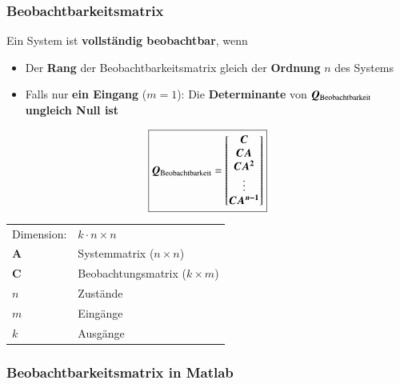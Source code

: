 \subsubsection{Beobachtbarkeitsmatrix}

Ein System ist \textbf{vollständig beobachtbar}, wenn
\begin{itemize}
    \item Der \textbf{Rang} der Beobachtbarkeitsmatrix gleich der \textbf{Ordnung} $n$ des Systems
    \item Falls nur \textbf{ein Eingang} ($m = 1$): Die \textbf{Determinante} von $\bm{Q}_{\rm Beobachtbarkeit}$ 
        \textbf{ungleich Null ist}
\end{itemize}

\begin{minipage}[c]{0.4\columnwidth}
    $$ \boxed{ \bm{Q}_{\rm Beobachtbarkeit} = 
    \begin{bmatrix}
        \bm{C} \\ \bm{C A} \\ \bm{C A^2} \\ \vdots \\ \bm{C A^{n-1}} 
    \end{bmatrix} } $$
\end{minipage}
\hfill
\begin{minipage}[c]{0.58\columnwidth}
    \begin{tabular}{ll}
        Dimension:  & $k \cdot n \times n$ \\
        $\bm{A}$    & Systemmatrix ($n \times n$) \\
        $\bm{C}$    & Beobachtungsmatrix ($k \times m$) \\
        $n$         & Zustände \\
        $m$         & Eingänge \\
        $k$         & Ausgänge 
    \end{tabular}
\end{minipage}


\subsubsection*{Beobachtbarkeitsmatrix in Matlab}





